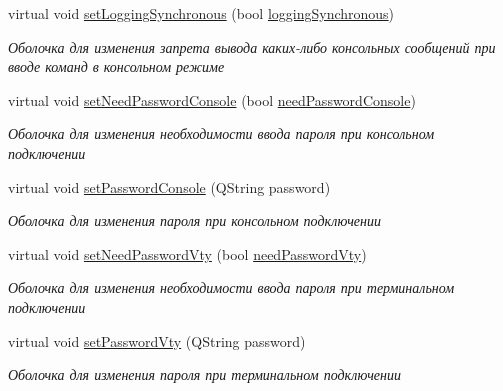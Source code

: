 \begin{DoxyCompactItemize}
virtual void \hyperlink{class_network_equipment_model_abe5f1892f0ca1bf727b8ceaf7baac189}{set\+Logging\+Synchronous} (bool \hyperlink{class_network_equipment_model_a7321ba74141fd1bc694a6607363625ae}{logging\+Synchronous})
\begin{DoxyCompactList}\small\item\em Оболочка для изменения запрета вывода каких-\/либо консольных сообщений при вводе команд в консольном режиме \end{DoxyCompactList}\item 
virtual void \hyperlink{class_network_equipment_model_afcdfd40284207e699e956dd3877a96c2}{set\+Need\+Password\+Console} (bool \hyperlink{class_network_equipment_model_ada70138a6ca4a8ad1bd07fa48998c9d8}{need\+Password\+Console})
\begin{DoxyCompactList}\small\item\em Оболочка для изменения необходимости ввода пароля при консольном подключении \end{DoxyCompactList}\item 
virtual void \hyperlink{class_network_equipment_model_aabfab95bca2f8b6b8d034662474e8dde}{set\+Password\+Console} (Q\+String password)
\begin{DoxyCompactList}\small\item\em Оболочка для изменения пароля при консольном подключении \end{DoxyCompactList}\item 
virtual void \hyperlink{class_network_equipment_model_a1d554674ebbe923251c73edb4832a470}{set\+Need\+Password\+Vty} (bool \hyperlink{class_network_equipment_model_aba3aec560271bbf72ee93fdf5e4c3a2e}{need\+Password\+Vty})
\begin{DoxyCompactList}\small\item\em Оболочка для изменения необходимости ввода пароля при терминальном подключении \end{DoxyCompactList}\item 
virtual void \hyperlink{class_network_equipment_model_ac6b735b52e9d5abef230bf6f0b475ab5}{set\+Password\+Vty} (Q\+String password)
\begin{DoxyCompactList}\small\item\em Оболочка для изменения пароля при терминальном подключении \end{DoxyCompactList}\end{DoxyCompactItemize}
